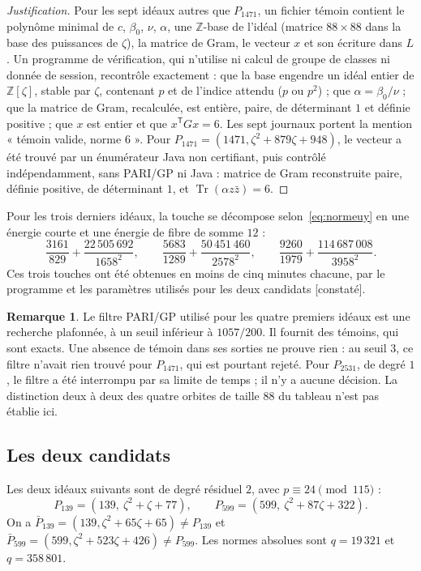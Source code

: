 \documentclass[11pt,a4paper]{amsart}
\theoremstyle{plain}
\theoremstyle{definition}
\newtheorem{remarque}[theoreme]{Remarque}
\numberwithin{equation}{section}
\newcommand{\Z}{\mathbb{Z}}
\DeclareMathOperator{\Tr}{Tr}
\newcommand{\st}[1]{\textup{\textsf{\small[#1]}}}
\newcommand{\CONS}{\st{constaté}}
\begin{document}
\begin{proof}[Justification]
Pour les sept idéaux autres que $P_{1471}$, un fichier témoin contient le polynôme minimal de $c$, $\beta_0$, $\nu$, $\alpha$, une $\Z$-base de l'idéal (matrice $88\times88$ dans la base des puissances de $\zeta$), la matrice de Gram, le vecteur $x$ et son écriture dans $L$. Un programme de vérification, qui n'utilise ni calcul de groupe de classes ni donnée de session, recontrôle exactement : que la base engendre un idéal entier de $\Z[\zeta]$, stable par $\zeta$, contenant $p$ et de l'indice attendu ($p$ ou $p^2$) ; que $\alpha=\beta_0/\nu$ ; que la matrice de Gram, recalculée, est entière, paire, de déterminant $1$ et définie positive ; que $x$ est entier et que $x^{\mathsf T}Gx=6$. Les sept journaux portent la mention « témoin valide, norme $6$ ». Pour $P_{1471}=(1471,\zeta^2+879\zeta+948)$, le vecteur a été trouvé par un énumérateur Java non certifiant, puis contrôlé indépendamment, sans PARI/GP ni Java : matrice de Gram reconstruite paire, définie positive, de déterminant $1$, et $\Tr(\alpha z\bar z)=6$.
\end{proof}

Pour les trois derniers idéaux, la touche se décompose selon~\eqref{eq:normeuy} en une énergie courte et une énergie de fibre de somme $12$ :
\[
\frac{3161}{829}+\frac{22\,505\,692}{1658^2},\qquad \frac{5683}{1289}+\frac{50\,451\,460}{2578^2},\qquad \frac{9260}{1979}+\frac{114\,687\,008}{3958^2}.
\]
Ces trois touches ont été obtenues en moins de cinq minutes chacune, par le programme et les paramètres utilisés pour les deux candidats \CONS.

\begin{remarque}
Le filtre PARI/GP utilisé pour les quatre premiers idéaux est une recherche plafonnée, à un seuil inférieur à $1057/200$. Il fournit des témoins, qui sont exacts. Une absence de témoin dans ses sorties ne prouve rien : au seuil $3$, ce filtre n'avait rien trouvé pour $P_{1471}$, qui est pourtant rejeté. Pour $P_{2531}$, de degré $1$, le filtre a été interrompu par sa limite de temps ; il n'y a aucune décision. La distinction deux à deux des quatre orbites de taille $88$ du tableau n'est pas établie ici.
\end{remarque}

\subsection{Les deux candidats}\label{subsec:candidats}

Les deux idéaux suivants sont de degré résiduel $2$, avec $p\equiv24\pmod{115}$ :
\[
P_{139}=(139,\ \zeta^2+\zeta+77),\qquad P_{599}=(599,\ \zeta^2+87\zeta+322).
\]
On a $\bar P_{139}=(139,\zeta^2+65\zeta+65)\ne P_{139}$ et $\bar P_{599}=(599,\zeta^2+523\zeta+426)\ne P_{599}$. Les normes absolues sont $q=19\,321$ et $q=358\,801$.
\end{document}
